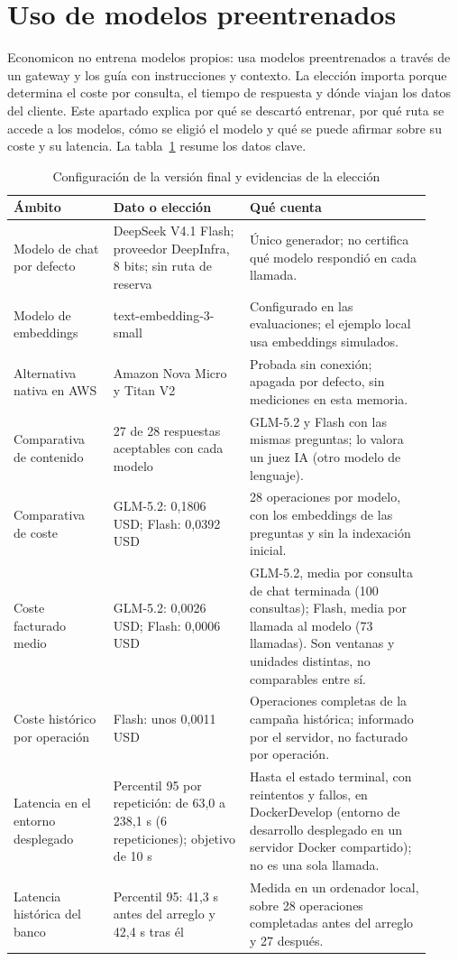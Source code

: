 \section{Uso de modelos preentrenados}\label{g-0}

Economicon no entrena modelos propios: usa modelos preentrenados a través de un gateway y los guía con instrucciones y contexto. La elección importa porque determina el coste por consulta, el tiempo de respuesta y dónde viajan los datos del cliente. Este apartado explica por qué se descartó entrenar, por qué ruta se accede a los modelos, cómo se eligió el modelo y qué se puede afirmar sobre su coste y su latencia. La tabla~\ref{tab-g1} resume los datos clave. \cite{config-gateway,aws,comparativa-modelos,evaluacion,coste-chat}

\begin{table}[!htbp]
\centering\footnotesize
\caption{Configuración de la versión final y evidencias de la elección}\label{tab-g1}
\begin{tabular}{@{}p{0.22\linewidth}p{0.3\linewidth}p{0.4\linewidth}@{}}
\toprule
\textbf{Ámbito} & \textbf{Dato o elección} & \textbf{Qué cuenta} \\
\midrule
Modelo de chat por defecto & DeepSeek V4.1 Flash; proveedor DeepInfra, 8 bits; sin ruta de reserva & Único generador; no certifica qué modelo respondió en cada llamada. \\
Modelo de embeddings & text-embedding-3-small & Configurado en las evaluaciones; el ejemplo local usa embeddings simulados. \\
Alternativa nativa en AWS & Amazon Nova Micro y Titan V2 & Probada sin conexión; apagada por defecto, sin mediciones en esta memoria. \\
Comparativa de contenido & 27 de 28 respuestas aceptables con cada modelo & GLM-5.2 y Flash con las mismas preguntas; lo valora un juez IA (otro modelo de lenguaje). \\
Comparativa de coste & GLM-5.2: 0,1806 USD; Flash: 0,0392 USD & 28 operaciones por modelo, con los embeddings de las preguntas y sin la indexación inicial. \\
Coste facturado medio & GLM-5.2: 0,0026 USD; Flash: 0,0006 USD & GLM-5.2, media por consulta de chat terminada (100 consultas); Flash, media por llamada al modelo (73 llamadas). Son ventanas y unidades distintas, no comparables entre sí. \\
Coste histórico por operación & Flash: unos 0,0011 USD & Operaciones completas de la campaña histórica; informado por el servidor, no facturado por operación. \\
Latencia en el entorno desplegado & Percentil 95 por repetición: de 63,0 a 238,1 s (6 repeticiones); objetivo de 10 s & Hasta el estado terminal, con reintentos y fallos, en DockerDevelop (entorno de desarrollo desplegado en un servidor Docker compartido); no es una sola llamada. \\
Latencia histórica del banco & Percentil 95: 41,3 s antes del arreglo y 42,4 s tras él & Medida en un ordenador local, sobre 28 operaciones completadas antes del arreglo y 27 después. \\
\bottomrule
\end{tabular}
\end{table}

